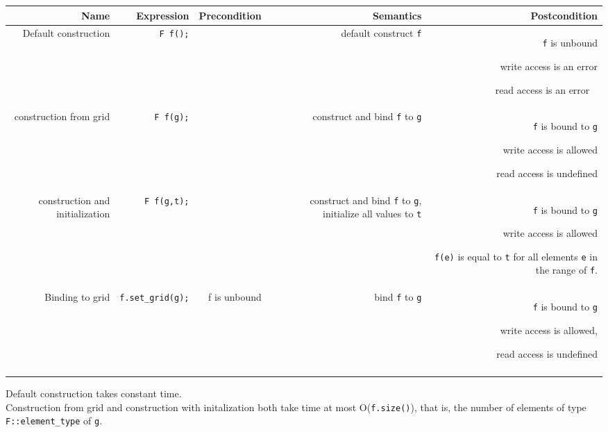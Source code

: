 \begin{tabularx}{15cm}{RRRRR} 
  \T \hline    
  \bf  Name     &
  \bf  Expression &
  \bf  Precondition&
  \bf  Semantics &
  \bf  Postcondition
  \\ 
  \hline
  Default construction & 
  {\tt F f();} &
  ~ &
  default construct {\tt f} &
  {\tt f} is unbound
  \par write access is an error
  \par read  access is an error
  ~
  \\ 
  construction from grid & 
  {\tt F f(g);} &
  ~ &
  construct and bind {\tt f}  to {\tt g} &
  {\tt f} is bound to {\tt g} 
  \par write access is allowed 
  \par read access is undefined
  \\ 
  construction and initialization & 
  {\tt F f(g,t);} &
  ~ &
  construct and bind {\tt f}  to {\tt g}, 
  initialize all values to {\tt t} &
  {\tt f} is bound to {\tt g} 
  \par write access is allowed 
  \par {\tt f(e)} is equal to {\tt t} for all elements {\tt e}
  in the range of {\tt f}.
  \\ 
  Binding to grid &
  {\tt f.set\_grid(g);} &
  f is unbound &
  bind {\tt f}  to {\tt g} &
  {\tt f} is bound to {\tt g} 
  \par write access is allowed, 
  \par read access is undefined
  \\ 
  \T \hline  \\
\end{tabularx}

Default construction takes constant time.
\\
Construction from grid and construction with initalization both
take time at most O({\tt f.size()}), that is, the number of 
elements of type {\tt F::element\_type} of {\tt g}.
 

 ~
\W\\

\W{}
    

\W{}

 
 ~
 ~
 ~

  

